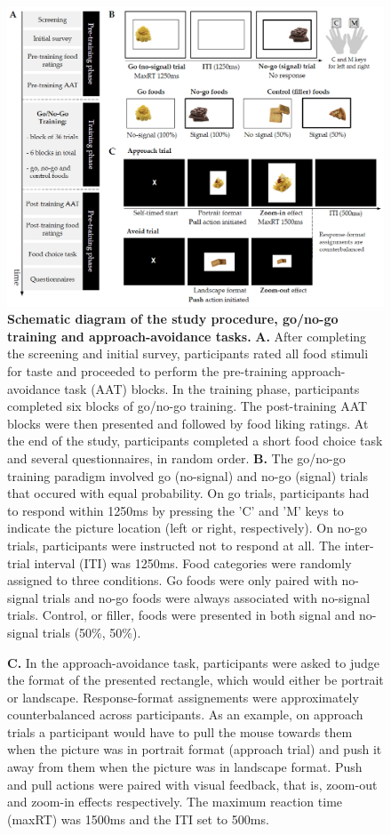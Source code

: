 \documentclass[man,floatsintext]{apa6}
\begin{document}
\begin{figure} [!htb]
\centering
\includegraphics[width=\linewidth]{figures/Figure1.png}
\caption{\textbf{Schematic diagram of the study procedure, go/no-go training and approach-avoidance tasks.} \textbf{A.} After completing the screening and initial survey, participants rated all food stimuli for taste and proceeded to perform the pre-training approach-avoidance task (AAT) blocks. In the training phase, participants completed six blocks of go/no-go training. The post-training AAT blocks were then presented and followed by food liking ratings. At the end of the study, participants completed a short food choice task and several questionnaires, in random order. \textbf{B.} The go/no-go training paradigm involved go (no-signal) and no-go (signal) trials that occured with equal probability. On go trials, participants had to respond within 1250ms by pressing the 'C' and 'M' keys to indicate the picture location (left or right, respectively). On no-go trials, participants were instructed not to respond at all. The inter-trial interval (ITI) was 1250ms. Food categories were randomly assigned to three conditions. Go foods were only paired with no-signal trials and no-go foods were always associated with no-signal trials. Control, or filler, foods were presented in both signal and no-signal trials (50\%, 50\%).}
\label{fig:procedure}
\end{figure}
\clearpage
\begin{figure}
    \ContinuedFloat
    \captionsetup{labelformat=empty}
    \caption{\textbf{C.} In the approach-avoidance task, participants were asked to judge the format of the presented rectangle, which would either be portrait or landscape. Response-format assignements were approximately counterbalanced across participants. As an example, on approach trials a participant would have to pull the mouse towards them when the picture was in portrait format (approach trial) and push it away from them when the picture was in landscape format. Push and pull actions were paired with visual feedback, that is, zoom-out and zoom-in effects respectively. The maximum reaction time (maxRT) was 1500ms and the ITI set to 500ms.}
\end{figure}
\end{document}
